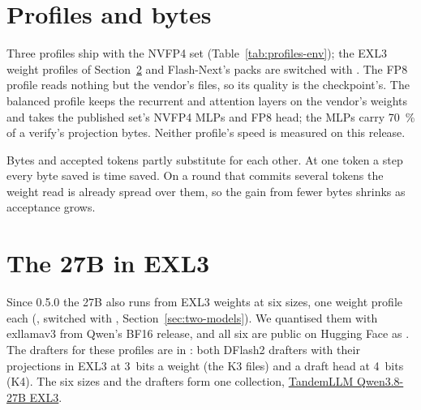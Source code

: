 \section{Profiles and bytes}

Three  profiles ship with the NVFP4 set (Table~\ref{tab:profiles-env}); the EXL3 weight profiles of Section~\ref{sec:exl3-27b} and Flash-Next's packs are switched with . The FP8 profile reads nothing but the vendor's files, so its quality is the checkpoint's. The balanced profile keeps the recurrent and attention layers on the vendor's weights and takes the published set's NVFP4 MLPs and FP8 head; the MLPs carry 70~\% of a verify's projection bytes. Neither profile's speed is measured on this release.

Bytes and accepted tokens partly substitute for each other. At one token a step every byte saved is time saved. On a round that commits several tokens the weight read is already spread over them, so the gain from fewer bytes shrinks as acceptance grows.

\section{The 27B in EXL3}\label{sec:exl3-27b}

Since 0.5.0 the 27B also runs from EXL3 weights at six sizes, one weight profile each (, switched with , Section~\ref{sec:two-models}). We quantised them with exllamav3 from Qwen's BF16 release, and all six are public on Hugging Face as . The drafters for these profiles are in : both DFlash2 drafters with their projections in EXL3 at 3~bits a weight (the K3 files) and a draft head at 4~bits (K4). The six sizes and the drafters form one collection, \href{https://huggingface.co/collections/0xBakeer/tandemllm-qwen38-27b-exl3-6acdd787008264fa4f35eab4}{TandemLLM Qwen3.8-27B EXL3}.

